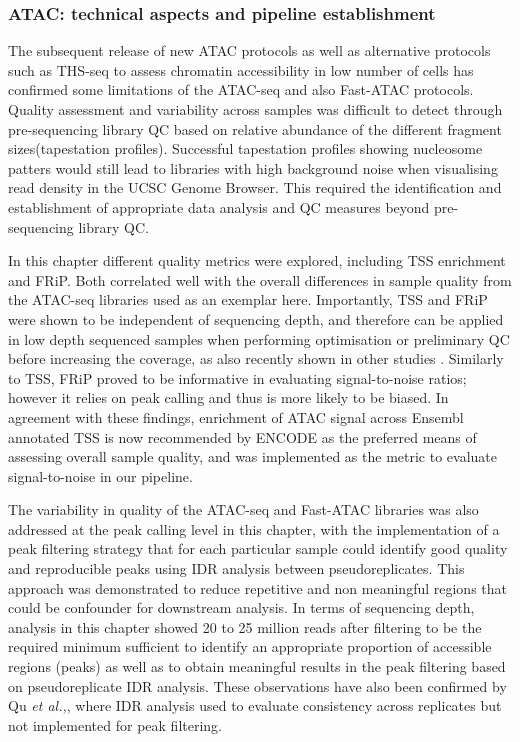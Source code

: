\subsubsection{ATAC: technical aspects and pipeline establishment}

The subsequent release of new ATAC protocols as well as alternative protocols such as THS-seq to assess chromatin accessibility in low number of cells has confirmed some limitations of the ATAC-seq and also Fast-ATAC protocols. Quality assessment and variability across samples was difficult to detect through pre-sequencing library QC based on relative abundance of the different fragment sizes(tapestation profiles). Successful tapestation profiles showing nucleosome patters would still lead to libraries with high background noise when visualising read density in the UCSC Genome Browser. This required the identification and establishment of appropriate data analysis and QC measures beyond pre-sequencing library QC.

In this chapter different quality metrics were explored, including TSS enrichment and FRiP. Both correlated well with the overall differences in sample quality from the ATAC-seq libraries used as an exemplar here. Importantly, TSS and FRiP were shown to be independent of sequencing depth, and therefore can be applied in low depth sequenced samples when performing optimisation or preliminary QC before increasing the coverage, as also recently shown in other studies \parencite{Corces2017}. Similarly to TSS, FRiP proved to be informative in evaluating signal-to-noise ratios; however it relies on peak calling and thus is more likely to be biased. In agreement with these findings, enrichment of ATAC signal across Ensembl annotated TSS is now recommended by ENCODE as the preferred means of assessing overall sample quality, and was implemented as the metric to evaluate signal-to-noise in our pipeline. 

The variability in quality of the ATAC-seq and Fast-ATAC libraries was also addressed at the peak calling level in this chapter, with the implementation of a peak filtering strategy that for each particular sample could identify good quality and reproducible peaks using IDR analysis between pseudoreplicates. This approach was demonstrated to reduce  repetitive and non meaningful regions that could be confounder for downstream analysis. In terms of sequencing depth, analysis in this chapter showed 20 to 25 million reads after filtering to be the required minimum sufficient to identify an appropriate proportion of accessible regions (peaks) as well as to obtain meaningful results in the peak filtering based on pseudoreplicate IDR analysis. These observations have also been confirmed by Qu \textit{et al.,}, where IDR analysis used to evaluate consistency across replicates but not implemented for peak filtering.

